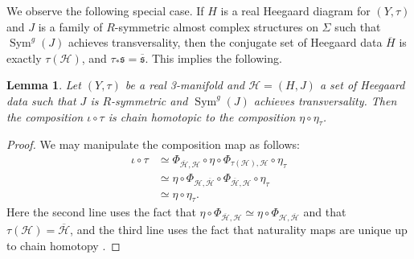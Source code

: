 \documentclass[11pt,reqno]{amsart}
\newtheorem{lem}[thm]{Lemma}
\theoremstyle{definition}
\theoremstyle{remark}
\DeclareMathOperator{\Sym}{{Sym}}
\newcommand{\cH}{\mathcal{H}}
\numberwithin{equation}{section}
\begin{document}
We observe the following special case. If $H$ is a real Heegaard diagram for $(Y,\tau)$ and $J$ is a family of $R$-symmetric almost complex structures on $\Sigma$ such that $\Sym^g(J)$ achieves transversality, then the conjugate set of Heegaard data $\overline{H}$ is exactly $\tau(\cH)$, and $\tau_* \mathfrak s = \overline{\mathfrak s}$. This implies the following.

\begin{lem} \label{lem:iotatau} Let $(Y, \tau)$ be a real 3-manifold and $\cH =(H,J)$ a set of Heegaard data such that $J$ is $R$-symmetric and $\Sym^g(J)$ achieves transversality. Then the composition $\iota \circ \tau$ is chain homotopic to the composition $\eta \circ \eta_{\tau}$. \end{lem}

\begin{proof} We may manipulate the composition map as follows:
%
\begin{align*}
\iota \circ \tau &\simeq \Phi_{\overline{\cH}, \cH} \circ \eta \circ  \Phi_{\tau(\mathcal H), \mathcal H} \circ \eta_{\tau} \\
				&\simeq \eta \circ \Phi_{\cH, \overline{\cH}} \circ  \Phi_{\overline{\mathcal H}, \mathcal H} \circ \eta_{\tau} \\
				&\simeq \eta \circ \eta_{\tau}.
\end{align*}
%
Here the second line uses the fact that $\eta \circ  \Phi_{\overline{\mathcal H}, \mathcal H} \simeq \eta \circ \Phi_{\cH, \overline{\cH}}$ \cite[Section 2]{HMInvolutive} and that $\tau(\cH) = \overline{\cH}$, and the third line uses the fact that naturality maps are unique up to chain homotopy \cite{JTNaturality}.
\end{proof}
\end{document}
